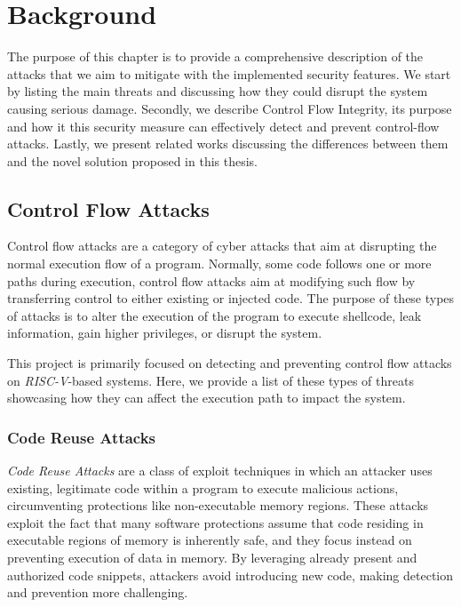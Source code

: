 \chapter{Background}
\label{cha:background}

The purpose of this chapter is to provide a comprehensive description of the
attacks that we aim to mitigate with the implemented security features. We start
by listing the main threats and discussing how they could disrupt the system causing
serious damage. Secondly, we describe Control Flow Integrity, its purpose and
how it this security measure can effectively detect and prevent control-flow
attacks. Lastly, we present related works discussing the differences between
them and the novel solution proposed in this thesis.

\section{Control Flow Attacks}
\label{sec:background_cfa}

Control flow attacks are a category of cyber attacks that aim at disrupting the normal
execution flow of a program. Normally, some code follows one or more paths during
execution, control flow attacks aim at modifying such flow by transferring
control to either existing or injected code. The purpose of these types of attacks
is to alter the execution of the program to execute shellcode, leak information,
gain higher privileges, or disrupt the system.

This project is primarily focused on detecting and preventing control flow
attacks on \textit{RISC-V}-based systems. Here, we provide a list of these types
of threats showcasing how they can affect the execution path to impact the system.

\subsection{Code Reuse Attacks}
\label{subsec:background_codereuse}

\textit{Code Reuse Attacks} are a class of exploit techniques in which an attacker
uses existing, legitimate code within a program to execute malicious actions, circumventing
protections like non-executable memory regions. These attacks exploit the fact
that many software protections assume that code residing in executable regions
of memory is inherently safe, and they focus instead on preventing execution of data
in memory. By leveraging already present and authorized code snippets, attackers
avoid introducing new code, making detection and prevention more challenging.

